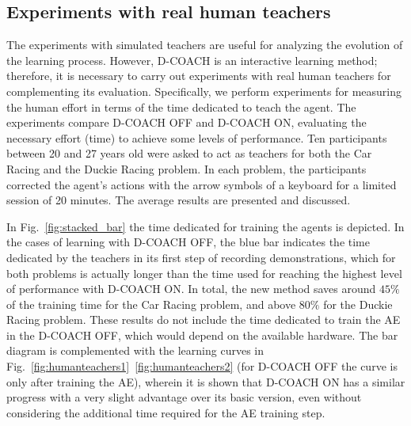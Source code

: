 \subsection{Experiments with real human teachers}

The experiments with simulated teachers are useful for analyzing the evolution of the learning process. However, D-COACH is an interactive learning method; therefore, it is necessary to carry out experiments with real human teachers for complementing its evaluation. Specifically, we perform experiments for measuring the human effort in terms of the time dedicated to teach the agent. The experiments compare D-COACH OFF and D-COACH ON, evaluating the necessary effort (time) to achieve some levels of performance. Ten participants between 20 and 27 years old were asked to act as teachers for both the Car Racing and the Duckie Racing problem. In each problem, the participants corrected the agent's actions with the arrow symbols of a keyboard for a limited session of 20 minutes. 
The average results are presented and discussed.

In Fig.~\ref{fig:stacked_bar} the time dedicated for training the agents is depicted. In the cases of learning with D-COACH OFF, the blue bar indicates the time dedicated by the teachers in its first step of recording demonstrations, which for both problems is actually longer than the time used for reaching the highest level of performance with D-COACH ON. In total, the new method saves around $45\%$ of the training time for the Car Racing problem, and above $80\%$ for the Duckie Racing problem. These results do not include the time dedicated to train the AE in the D-COACH OFF, which would depend on the available hardware. The bar diagram is complemented with the learning curves in Fig.~\ref{fig:humanteachers1}~\ref{fig:humanteachers2} (for D-COACH OFF the curve is only after training the AE), wherein it is shown that D-COACH ON has a similar progress with a very slight advantage over its basic version, even without considering the additional time required for the AE training step.

